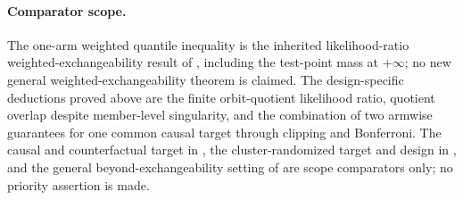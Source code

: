 \paragraph{Comparator scope.} The one-arm weighted quantile inequality is the inherited likelihood-ratio weighted-exchangeability result of \cite{TibshiraniBarberCandesRamdas2019}, including the test-point mass at \(+\infty\); no new general weighted-exchangeability theorem is claimed. The design-specific deductions proved above are the finite orbit-quotient likelihood ratio, quotient overlap despite member-level singularity, and the combination of two armwise guarantees for one common causal target through clipping and Bonferroni. The causal and counterfactual target in \cite{LeiCandes2021}, the cluster-randomized target and design in \cite{WangLiYu2025}, and the general beyond-exchangeability setting of \cite{BarberCandesRamdasTibshirani2023} are scope comparators only; no priority assertion is made.